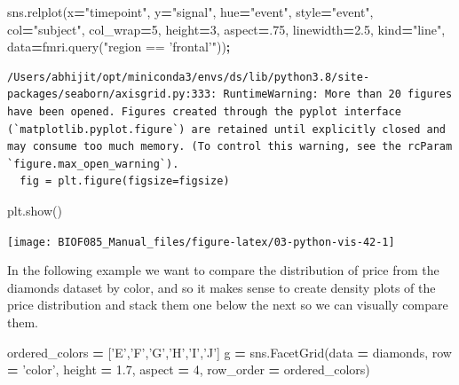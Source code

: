 \documentclass[
  letterpaper,
]{scrbook}
\newenvironment{Shaded}{\begin{snugshade}}{\end{snugshade}}
\newcommand{\DecValTok}[1]{\textcolor[rgb]{0.00,0.00,0.81}{#1}}
\newcommand{\FloatTok}[1]{\textcolor[rgb]{0.00,0.00,0.81}{#1}}
\newcommand{\NormalTok}[1]{#1}
\newcommand{\OperatorTok}[1]{\textcolor[rgb]{0.81,0.36,0.00}{\textbf{#1}}}
\newcommand{\StringTok}[1]{\textcolor[rgb]{0.31,0.60,0.02}{#1}}
\begin{document}
\begin{Shaded}
\begin{Highlighting}[]
\NormalTok{sns.relplot(x}\OperatorTok{=}\StringTok{"timepoint"}\NormalTok{, y}\OperatorTok{=}\StringTok{"signal"}\NormalTok{, hue}\OperatorTok{=}\StringTok{"event"}\NormalTok{, style}\OperatorTok{=}\StringTok{"event"}\NormalTok{,}
\NormalTok{            col}\OperatorTok{=}\StringTok{"subject"}\NormalTok{, col_wrap}\OperatorTok{=}\DecValTok{5}\NormalTok{,}
\NormalTok{            height}\OperatorTok{=}\DecValTok{3}\NormalTok{, aspect}\OperatorTok{=}\NormalTok{.}\DecValTok{75}\NormalTok{, linewidth}\OperatorTok{=}\FloatTok{2.5}\NormalTok{,}
\NormalTok{            kind}\OperatorTok{=}\StringTok{"line"}\NormalTok{, data}\OperatorTok{=}\NormalTok{fmri.query(}\StringTok{"region == 'frontal'"}\NormalTok{))}\OperatorTok{;}
\end{Highlighting}
\end{Shaded}

\begin{verbatim}
/Users/abhijit/opt/miniconda3/envs/ds/lib/python3.8/site-packages/seaborn/axisgrid.py:333: RuntimeWarning: More than 20 figures have been opened. Figures created through the pyplot interface (`matplotlib.pyplot.figure`) are retained until explicitly closed and may consume too much memory. (To control this warning, see the rcParam `figure.max_open_warning`).
  fig = plt.figure(figsize=figsize)
\end{verbatim}

\begin{Shaded}
\begin{Highlighting}[]
\NormalTok{plt.show()}
\end{Highlighting}
\end{Shaded}

\begin{center}\texttt{[image: BIOF085\_Manual\_files/figure-latex/03-python-vis-42-1]} \end{center}

In the following example we want to compare the distribution of price from the diamonds dataset by color, and so it makes sense to create density plots of the price distribution and stack them one below the next so we can visually compare them.

\begin{Shaded}
\begin{Highlighting}[]
\NormalTok{ordered_colors }\OperatorTok{=}\NormalTok{ [}\StringTok{'E'}\NormalTok{,}\StringTok{'F'}\NormalTok{,}\StringTok{'G'}\NormalTok{,}\StringTok{'H'}\NormalTok{,}\StringTok{'I'}\NormalTok{,}\StringTok{'J'}\NormalTok{]}
\NormalTok{g }\OperatorTok{=}\NormalTok{ sns.FacetGrid(data }\OperatorTok{=}\NormalTok{ diamonds, row }\OperatorTok{=} \StringTok{'color'}\NormalTok{, height }\OperatorTok{=} \FloatTok{1.7}\NormalTok{, }
\NormalTok{                  aspect }\OperatorTok{=} \DecValTok{4}\NormalTok{, row_order }\OperatorTok{=}\NormalTok{ ordered_colors)}
\end{Highlighting}
\end{Shaded}
\end{document}
